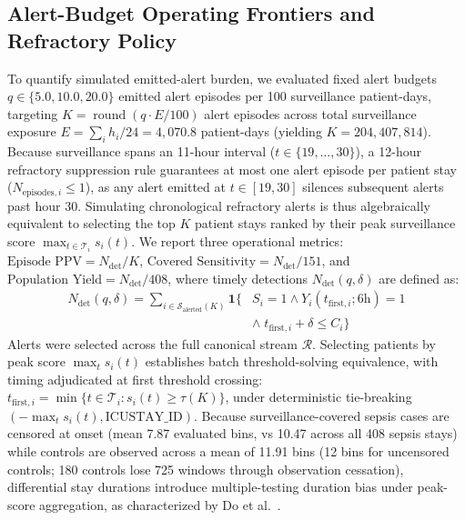 \documentclass[12pt,a4paper]{article}
\begin{document}
\subsection{Alert-Budget Operating Frontiers and Refractory Policy}
To quantify simulated emitted-alert burden, we evaluated fixed alert budgets $q \in \{5.0, 10.0, 20.0\}$ emitted alert episodes per 100 surveillance patient-days, targeting $K = \operatorname{round}(q \cdot E / 100)$ alert episodes across total surveillance exposure $E = \sum_i h_i / 24 = 4,070.8$ patient-days (yielding $K=204, 407, 814$). Because surveillance spans an 11-hour interval ($t \in \{19, \dots, 30\}$), a 12-hour refractory suppression rule guarantees at most one alert episode per patient stay ($N_{\text{episodes}, i} \le 1$), as any alert emitted at $t \in [19, 30]$ silences subsequent alerts past hour 30. Simulating chronological refractory alerts is thus algebraically equivalent to selecting the top $K$ patient stays ranked by their peak surveillance score $\max_{t \in \mathcal{T}_i} s_i(t)$. We report three operational metrics: $\text{Episode PPV} = N_{\text{det}} / K$, $\text{Covered Sensitivity} = N_{\text{det}} / 151$, and $\text{Population Yield} = N_{\text{det}} / 408$, where timely detections $N_{\text{det}}(q, \delta)$ are defined as:
\begin{equation}
\begin{aligned}
N_{\text{det}}(q, \delta) = \sum_{i \in \mathcal{S}_{\text{alerted}}(K)} \mathbf{1} \bigl\{ & S_i = 1 \land Y_i(t_{\mathrm{first}, i}; 6\text{h}) = 1 \\
& \land \; t_{\mathrm{first}, i} + \delta \le C_i \bigr\}
\end{aligned}
\end{equation}
Alerts were selected across the full canonical stream $\mathcal{R}$. Selecting patients by peak score $\max_t s_i(t)$ establishes batch threshold-solving equivalence, with timing adjudicated at first threshold crossing: $t_{\mathrm{first}, i} = \min \{ t \in \mathcal{T}_i : s_i(t) \ge \tau(K) \}$, under deterministic tie-breaking $(-\max_{t} s_i(t), \text{ICUSTAY\_ID})$. Because surveillance-covered sepsis cases are censored at onset (mean 7.87 evaluated bins, vs 10.47 across all 408 sepsis stays) while controls are observed across a mean of 11.91 bins (12 bins for uncensored controls; 180 controls lose 725 windows through observation cessation), differential stay durations introduce multiple-testing duration bias under peak-score aggregation, as characterized by Do et al.~\cite{do2026continuous}.
\end{document}
